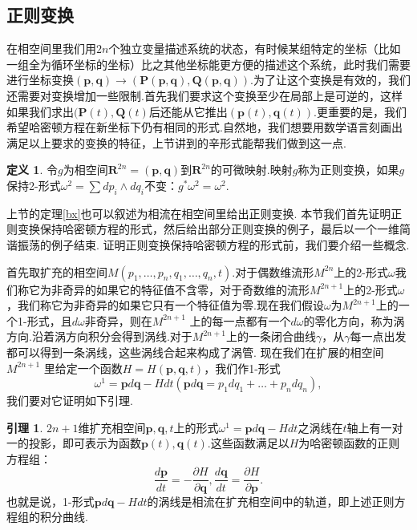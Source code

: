\documentclass[UTF8,10.5pt,a4paper]{ctexart}
\numberwithin{equation}{section}
\theoremstyle{definition}
\newtheorem{lem}{引理\hspace{0.05pt}}[section]
\theoremstyle{definition}
\newtheorem{dfn}{定义\hspace{0.05pt}}[section]
\begin{document}
\subsection{正则变换}
在相空间里我们用$2n$个独立变量描述系统的状态，有时候某组特定的坐标（比如一组全为循环坐标的坐标）比之其他坐标能更方便的描述这个系统，此时我们需要进行坐标变换$(\textbf{p},\textbf{q})\rightarrow (\textbf{P}(\textbf{p},\textbf{q}),\textbf{Q}(\textbf{p},\textbf{q}))$.为了让这个变换是有效的，我们还需要对变换增加一些限制.首先我们要求这个变换至少在局部上是可逆的，这样如果我们求出$(\textbf{P}(t),\textbf{Q}(t)$后还能从它推出$(\textbf{p}(t),\textbf{q}(t))$.更重要的是，我们希望哈密顿方程在新坐标下仍有相同的形式.自然地，我们想要用数学语言刻画出满足以上要求的变换的特征，上节讲到的辛形式能帮我们做到这一点.
\begin{dfn}
令$g$为相空间$\mathbf{R}^{2n}={(\textbf{p},\textbf{q})}$到$\textbf{R}^{2n}$的可微映射.映射$g$称为正则变换，如果$g$保持2-形式$\omega^2=\sum dp_i\wedge dq_i$不变：$g^*\omega^2=\omega^2$.
\end{dfn}
上节的定理\ref{bx}也可以叙述为相流在相空间里给出正则变换.
本节我们首先证明正则变换保持哈密顿方程的形式，然后给出部分正则变换的例子，最后以一个一维简谐振荡的例子结束.
证明正则变换保持哈密顿方程的形式前，我们要介绍一些概念.
\par 首先取扩充的相空间$M(p_1,\ldots,p_n,q_1,\ldots,q_n,t)$.对于偶数维流形$M^{2n}$上的2-形式$\omega$我们称它为非奇异的如果它的特征值不含零，对于奇数维的流形$M^{2n+1}$上的2-形式$\omega$，我们称它为非奇异的如果它只有一个特征值为零.现在我们假设$\omega$为$M^{2n+1}$上的一个1-形式，且$d\omega$非奇异，则在$M^{2n+1}$ 上的每一点都有一个$d\omega$的零化方向，称为涡方向.沿着涡方向积分会得到涡线.对于$M^{2n+1}$上的一条闭合曲线$\gamma$，从$\gamma$每一点出发都可以得到一条涡线，这些涡线合起来构成了涡管. 现在我们在扩展的相空间$M^{2n+1}$ 里给定一个函数$H=H(\textbf{p},\textbf{q},t)$，我们作1-形式
$$\omega^1=\textbf{p}d\textbf{q}-Hdt(\textbf{p}d\textbf{q}=p_1dq_1+\ldots+p_ndq_n),$$
我们要对它证明如下引理.
\begin{lem}\label{pv}
$2n+1$维扩充相空间$\textbf{p},\textbf{q},t$上的形式$\omega^1=\textbf{p}d\textbf{q}-Hdt$之涡线在$t$轴上有一对一的投影，即可表示为函数$\textbf{p}(t),\textbf{q}(t)$.这些函数满足以$H$为哈密顿函数的正则方程组：
\begin{equation}
\frac{d\textbf{p}}{dt}=-\frac{\partial H}{\partial \textbf{q}},\frac{d\textbf{q}}{dt}=\frac{\partial H}{\partial \textbf{p}} \label{Eq:H3} .
\end{equation}
也就是说，1-形式$\textbf{p}d\textbf{q}-Hdt$的涡线是相流在扩充相空间中的轨道，即上述正则方程组的积分曲线.
\end{lem}
\end{document}
